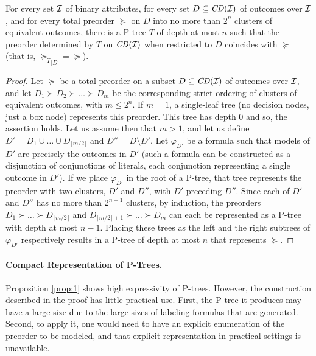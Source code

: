 \begin{prop}
\label{prop:1}
For every set $\mathcal{I}$ of binary attributes, for every set $D\subseteq\mathit{CD}(\mathcal{I})$
of outcomes over $\mathcal{I}$, and for every total preorder $\succeq$ on $D$ into
no more than $2^n$ clusters of equivalent outcomes, there is a P-tree $T$ 
of depth at most $n$ such that the preorder determined by $T$ on $\mathit{CD}(\mathcal{I})$ 
when restricted to $D$ coincides with $\succeq$ 
(that is, ${\succeq_T}_{|D}=\succeq$).
\end{prop}
\begin{proof}
Let $\succeq$ be a total preorder on a subset $D\subseteq \mathit{CD}(\mathcal{I})$ of outcomes
over $\mathcal{I}$, and let $D_1\succ D_2\succ \ldots\succ D_m$ be the corresponding 
strict ordering of clusters of equivalent outcomes, with $m\leq 2^n$. If
$m=1$, a single-leaf tree (no decision nodes, just a box node) represents 
this preorder. This tree has depth 0 and so, the assertion holds. Let us assume
then that $m>1$, and let us define $D'=D_1\cup\ldots\cup D_{\lceil m/2\rceil}$ 
and $D''=D\setminus
D'$. Let $\varphi_{D'}$ be a formula such that models of $D'$ 
are precisely the outcomes in $D'$ (such a formula can be constructed as a
disjunction of conjunctions of literals, each conjunction representing a
single outcome in $D'$). If we place $\varphi_{D'}$ in the root of a P-tree,
that tree represents the preorder with two clusters, $D'$ and $D''$, with 
$D'$ preceding $D''$. Since each of $D'$ and $D''$ has no more than $2^{n-1}$
clusters, by induction, the preorders $D_1\succ \ldots\succ 
D_{\lceil m/2\rceil}$ and $D_{\lceil m/2\rceil+1}\succ \ldots\succ D_m$ 
can each be represented as a P-tree with depth at most $n-1$. Placing
these trees as the left and the right subtrees of $\varphi_{D'}$ 
respectively results in a P-tree of depth at most $n$ that represents
$\succeq$. 
\end{proof}

\paragraph{\bf Compact Representation of P-Trees.}
Proposition \ref{prop:1} shows high expressivity 
of P-trees. However, the construction described in the proof has little 
practical use. First, the P-tree it produces may have a 
large size due to the large sizes of labeling formulas that are generated. 
Second, to apply it, one would need to have an explicit enumeration of 
the preorder to be modeled, and that explicit representation in practical 
settings is unavailable.         

